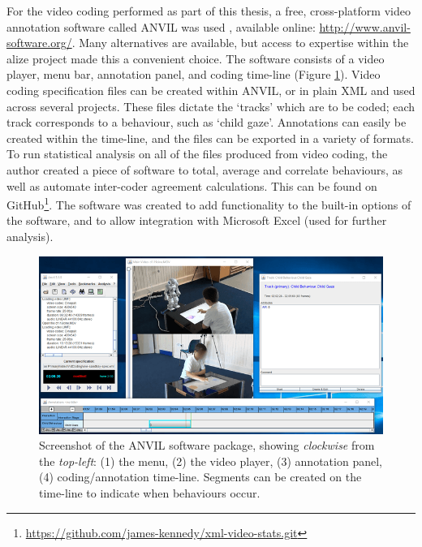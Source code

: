 For the video coding performed as part of this thesis, a free, cross-platform video annotation software called ANVIL was used \citep{kipp2001anvil}, available online: \url{http://www.anvil-software.org/}. Many alternatives are available, but access to expertise within the \acrshort{alize} project made this a convenient choice. The software consists of a video player, menu bar, annotation panel, and coding time-line (Figure \ref{fig:ch3_anvil}). Video coding specification files can be created within ANVIL, or in plain XML and used across several projects. These files dictate the `tracks' which are to be coded; each track corresponds to a behaviour, such as `child gaze'. Annotations can easily be created within the time-line, and the files can be exported in a variety of formats. To run statistical analysis on all of the files produced from video coding, the author created a piece of software to total, average and correlate behaviours, as well as automate inter-coder agreement calculations. This can be found on GitHub\footnote{\url{https://github.com/james-kennedy/xml-video-stats.git}}. The software was created to add functionality to the built-in options of the software, and to allow integration with Microsoft Excel (used for further analysis).

\begin{figure}[ht]
    \centering
    \includegraphics[width=1.0\textwidth]{images/ch3_anvil_comp.png}
    \caption{Screenshot of the ANVIL software package, showing \textit{clockwise} from the \textit{top-left}: (1) the menu, (2) the video player, (3) annotation panel, (4) coding/annotation time-line. Segments can be created on the time-line to indicate when behaviours occur.}
    \label{fig:ch3_anvil}
\end{figure}

